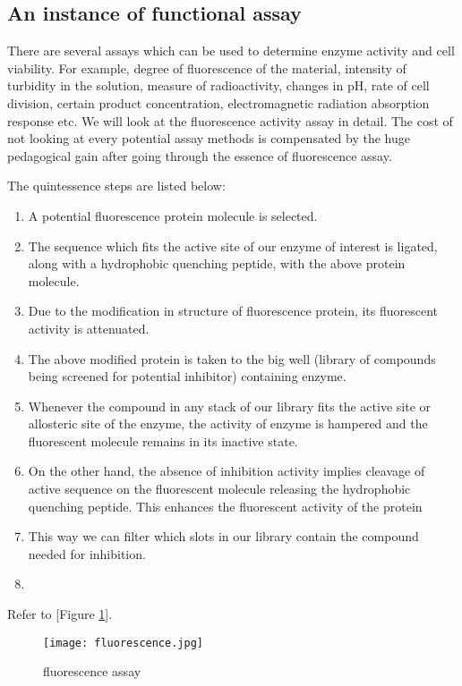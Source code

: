 \documentclass[12pt]{article}
\begin{document}
\subsection{An instance of functional assay}
There are several assays which can be used to determine enzyme activity and cell viability.
For example, degree of fluorescence of the material, intensity of turbidity in the solution, measure of radioactivity, changes in pH, rate of cell division, certain product concentration, electromagnetic radiation absorption response etc.
We will look at the fluorescence activity assay in detail. The cost of not looking at every potential assay methods is compensated by the huge pedagogical gain after going through the essence of fluorescence assay.


The quintessence steps are listed below:
\begin{enumerate}
\item A potential fluorescence protein molecule is selected.
\item The sequence which fits the active site of our enzyme of interest is ligated, along with a  hydrophobic quenching peptide, with the above protein molecule.
\item Due to the modification in structure of fluorescence protein, its fluorescent activity is attenuated.
\item The above modified protein is taken to the big well (library of compounds being screened for potential inhibitor) containing enzyme.
\item Whenever the compound in any stack of our library fits the active site or allosteric site of the enzyme, the activity of enzyme is hampered and the fluorescent molecule remains in its inactive state.
\item On the other hand, the absence of inhibition activity implies cleavage of active sequence on the fluorescent molecule releasing the hydrophobic quenching peptide. This enhances the fluorescent activity of the protein
\item This way we can filter which slots in our library contain the compound needed for inhibition.
\item 
\end{enumerate}
Refer to [Figure \ref{fig fl}].
\begin{figure}[h]
\centering
\texttt{[image: fluorescence.jpg]}
\label{fig fl}
\caption{fluorescence assay}
\end{figure}
\clearpage
\end{document}
